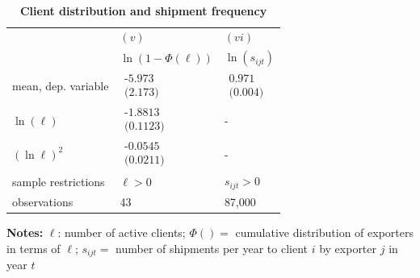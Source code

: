 \documentclass[12pt]{article}
\begin{document}
\begin{table}[tbp]
\caption{\textbf{Client distribution and shipment frequency}}
\label{tab:client_dist}\centering
{\small \ }
\par
{\small 
\begin{tabular}{lll}
\hline\hline
& $(v)$ & $(vi)$ \\ 
& $\ln (1-\Phi (\ell ))$ & $\ln (s_{ijt})$ \\ \hline
mean, dep. variable & $%
\begin{array}{c}
\text{-5.973} \\ 
\text{(2.173)}%
\end{array}%
$ & $%
\begin{array}{c}
\text{0.971 } \\ 
\text{(0.004)}%
\end{array}%
$ \\ 
$\ln (\ell )$ & $%
\begin{array}{c}
\text{-1.8813 } \\ 
\text{(0.1123)}%
\end{array}%
$ & - \\ 
$(\ln \ell )^{2}$ & $%
\begin{array}{c}
\text{-0.0545 } \\ 
\text{(0.0211)}%
\end{array}%
$ & - \\ \hline
sample restrictions & $\ell >0$ & $s_{ijt}>0$ \\ 
observations & 43 & 87,000 \\ \hline
\end{tabular}
} \endcenter%
\begin{tablenotes}
\item \textbf{Notes:} $\ell$: number of active clients;  $\Phi ( ) = $ cumulative distribution of exporters in terms of  $\ell$;
$s_{ijt}=$ number of shipments per year to client $i$ by exporter $j$ in year $t$
\end{tablenotes}
\end{table}
\end{document}

